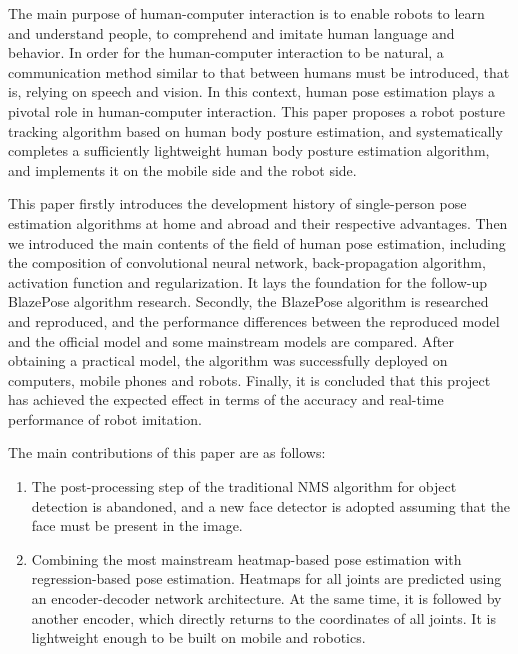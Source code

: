 \begin{eabstract}
The main purpose of human-computer interaction is to enable robots to learn and understand people, to comprehend and imitate human language and behavior. In order for the human-computer interaction to be natural, a communication method similar to that between humans must be introduced, that is, relying on speech and vision. In this context, human pose estimation plays a pivotal role in human-computer interaction. This paper proposes a robot posture tracking algorithm based on human body posture estimation, and systematically completes a sufficiently lightweight human body posture estimation algorithm, and implements it on the mobile side and the robot side.

This paper firstly introduces the development history of single-person pose estimation algorithms at home and abroad and their respective advantages. Then we introduced the main contents of the field of human pose estimation, including the composition of convolutional neural network, back-propagation algorithm, activation function and regularization. It lays the foundation for the follow-up BlazePose algorithm research. Secondly, the BlazePose algorithm is researched and reproduced, and the performance differences between the reproduced model and the official model and some mainstream models are compared. After obtaining a practical model, the algorithm was successfully deployed on computers, mobile phones and robots. Finally, it is concluded that this project has achieved the expected effect in terms of the accuracy and real-time performance of robot imitation.

The main contributions of this paper are as follows:

\begin{enumerate}
\item The post-processing step of the traditional NMS algorithm for object detection is abandoned, and a new face detector is adopted assuming that the face must be present in the image.

\item Combining the most mainstream heatmap-based pose estimation with regression-based pose estimation. Heatmaps for all joints are predicted using an encoder-decoder network architecture. At the same time, it is followed by another encoder, which directly returns to the coordinates of all joints. It is lightweight enough to be built on mobile and robotics.
\end{enumerate}
\end{eabstract}
